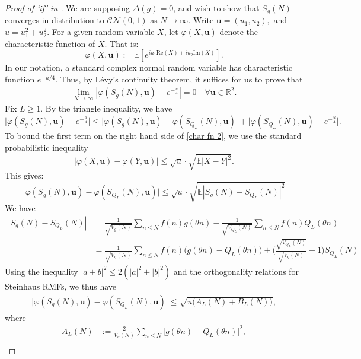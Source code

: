 \documentclass[12pt]{amsart}
\renewcommand{\le}{\leqslant}
\renewcommand{\leq}{\leqslant}
\renewcommand{\geq}{\geqslant}
\numberwithin{equation}{section}
\theoremstyle{plain}
\theoremstyle{definition}
\newcommand{\R}{\mathbb{R}}
\newcommand{\E}{\mathbb{E}}
\newcommand{\CC}{\mathcal{C}}
\newcommand{\CN}{\mathcal{N}}
\renewcommand{\phi}{\varphi}
\renewcommand{\Re}{\mathrm{Re}}
\renewcommand{\Im}{\mathrm{Im}}
\begin{document}
	\begin{proof}[Proof of `if' in ]
		We are supposing $\Delta(g) = 0$, and wish to show that $S_{g}(N)$ converges in distribution to $\CC\CN(0,1)$ as $N \to \infty$. Write $\bm{u} = (u_1,u_2),$ and $u = u_1^2+u_2^2$. For a given random variable $X$, let $\phi(X,\bm{u})$ denote the characteristic function of $X$. That is: $$\phi(X,\bm{u}) := \E[e^{i u_1 \Re(X) + iu_2\Im(X)}].$$
		In our notation, a standard complex normal random variable has characteristic function $e^{-u/4}$. Thus, by L\'evy's continuity theorem, it suffices for us to prove that
		\begin{align}\lim_{N \to \infty} |\phi(S_g(N),\bm{u})- e^{-\frac{u}{4}}| = 0 \quad \forall \bm{u}\in \R^2 \label{char fn 1}.
		\end{align}
		Fix $L \geq 1$. By the triangle inequality, we have
		\begin{equation}\label{char fn 2}
			\big|\phi(S_g(N),\bm{u})-e^{-\frac{u}{4}}\big| \leq\big|\phi(S_g(N),\bm{u})- \phi(S_{Q_L}(N),\bm{u})\big| + \big|\phi(S_{Q_L}(N),\bm{u})- e^{-\frac{u}{4}}\big|.
		\end{equation}
		To bound the first term on the right hand side of \eqref{char fn 2}, we use the standard probabilistic inequality$$|\phi(X,\bm{u})-\phi(Y,\bm{u})| \leq \sqrt{u} \cdot \sqrt{\E |X-Y|^2}.$$
		This gives:
		\begin{equation*}
			\big|\phi(S_g(N),\bm{u})- \phi(S_{Q_L}(N),\bm{u})\big| \le \sqrt{u} \cdot \sqrt{\E |S_g(N)-S_{Q_L}(N)|^2}
		\end{equation*}
		We have
		\begin{align*}
			|S_g(N)-S_{Q_L}(N)| &= \frac{1}{\sqrt{V_{g}(N)}} \sum_{n \leq N} f(n) g(\theta n) -\frac{1}{\sqrt{V_{Q_L}(N)}} \sum_{n \leq N} f(n) Q_L(\theta n)\\
			&=  \frac{1}{\sqrt{V_{g}(N)}} \sum_{n \leq N} f(n) \Big(g(\theta n)-Q_L(\theta n)\Big) +\bigg(\frac{\sqrt{V_{Q_L}(N)}}{\sqrt{V_{g}(N)}} - 1\bigg)  S_{Q_L}(N)
		\end{align*}
		Using the inequality $|a+b|^2 \leq 2(|a|^2+|b|^2)$ and the orthogonality relations for Steinhaus RMFs, we thus have 
		\begin{align}\label{char fn 3}
			\big|\phi(S_g(N),\bm{u})- \phi(S_{Q_L}(N),\bm{u})\big| \le \sqrt{u\big(A_L(N) + B_L(N)\big)},
		\end{align}
		where \begin{align*}
			A_L(N) &:= \frac{2}{V_{g}(N)} \sum_{n \leq N}  \Big|g(\theta n)-Q_L(\theta n)\Big|^2,\\

\end{align*}
\end{proof}
\end{document}
